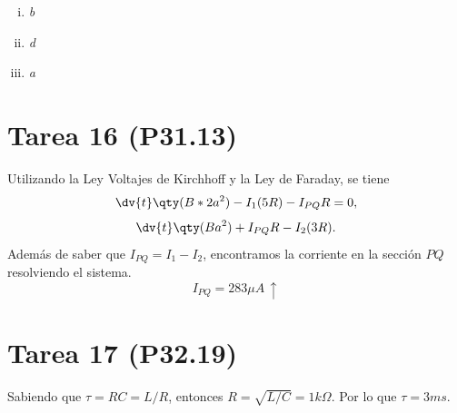 \begin{enumerate}[i)]
	\item \textit{b}
	\item \textit{d}
	\item \textit{a}
\end{enumerate}












\section*{Tarea 16 (P31.13)}

Utilizando la Ley Voltajes de Kirchhoff y la Ley de Faraday, se tiene
	$$ \dv{t} \qty(B*2a^2) - I_1 (5R) - I_{PQ} R = 0, $$
	$$ \dv{t} \qty(Ba^2) +I_{PQ} R - I_2 (3R). $$
Además de saber que $I_{PQ} = I_1 - I_2$, encontramos la corriente en la sección $PQ$ resolviendo el sistema.
	$$ \boxed{ I_{PQ} = 283\mu A\, \uparrow } $$












\section*{Tarea 17 (P32.19)}

Sabiendo que $\tau = RC = L/R$, entonces $R = \sqrt{L/C} = \boxed{ 1k\Omega }$. Por lo que $\boxed{\tau = 3ms}$.













